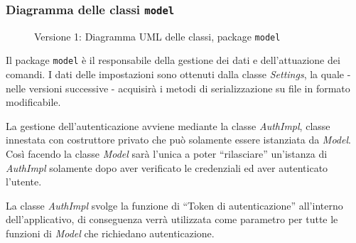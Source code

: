 \subsubsection{Diagramma delle classi \texttt{model}}
\vspace{0.5cm}
\begin{figure}[H]
    \centering
    \caption{Versione 1: Diagramma UML delle classi, package \texttt{model}}
    \label{fig:class_model_v_1}
\end{figure}

Il package \texttt{model} è il responsabile della gestione dei dati e dell'attuazione dei comandi.
I dati delle impostazioni sono ottenuti dalla classe \textit{Settings}, la quale - nelle versioni successive -
acquisirà i metodi di serializzazione su file in formato modificabile. 

La gestione dell'autenticazione avviene mediante la classe \textit{AuthImpl}, classe innestata con costruttore privato
che può solamente essere istanziata da \textit{Model}.
Così facendo la classe \textit{Model} sarà l'unica a poter ``rilasciare'' un'istanza di \textit{AuthImpl} 
solamente dopo aver verificato le credenziali ed aver autenticato l'utente.

La classe \textit{AuthImpl} svolge la funzione di ``Token di autenticazione'' all'interno dell'applicativo, 
di conseguenza verrà utilizzata come parametro per tutte le funzioni di \textit{Model} che richiedano autenticazione.